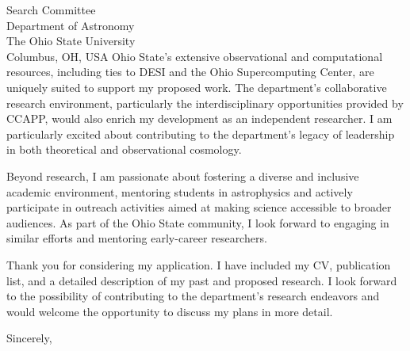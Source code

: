 \documentclass[11pt]{letter}
\begin{document}
\begin{letter}{Search Committee \\ Department of Astronomy \\ The Ohio State University \\ Columbus, OH, USA}
Ohio State's extensive observational and computational resources, including ties to DESI and the Ohio Supercomputing Center, are uniquely suited to support my proposed work. The department's collaborative research environment, particularly the interdisciplinary opportunities provided by CCAPP, would also enrich my development as an independent researcher. I am particularly excited about contributing to the department's legacy of leadership in both theoretical and observational cosmology.

Beyond research, I am passionate about fostering a diverse and inclusive academic environment, mentoring students in astrophysics and actively participate in outreach activities aimed at making science accessible to broader audiences. As part of the Ohio State community, I look forward to engaging in similar efforts and mentoring early-career researchers.

Thank you for considering my application. I have included my CV, publication list, and a detailed description of my past and proposed research. I look forward to the possibility of contributing to the department's research endeavors and would welcome the opportunity to discuss my plans in more detail.

\closing{Sincerely,}

\end{letter}
\end{document}
